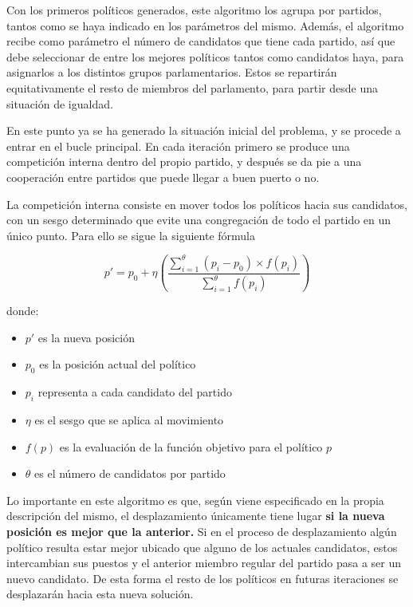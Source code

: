 Con los primeros políticos generados, este algoritmo los agrupa por partidos, tantos como se haya indicado en los parámetros del mismo. Además, el algoritmo recibe como parámetro el número de candidatos que tiene cada partido, así que debe seleccionar de entre los mejores políticos tantos como candidatos haya, para asignarlos a los distintos grupos parlamentarios. Estos se repartirán equitativamente el resto de miembros del parlamento, para partir desde una situación de igualdad.

En este punto ya se ha generado la situación inicial del problema, y se procede a entrar en el bucle principal. En cada iteración primero se produce una competición interna dentro del propio partido, y después se da pie a una cooperación entre partidos que puede llegar a buen puerto o no.

La competición interna consiste en mover todos los políticos hacia sus candidatos, con un sesgo determinado que evite una congregación de todo el partido en un único punto. Para ello se sigue la siguiente fórmula

\begin{equation}\label{poa-eq-desplazamiento}
	p' = p_0 + \eta(\frac{\sum_{i=1}^{\theta}(p_i - p_0) \times f(p_i)}{\sum_{i=1}^{\theta}f(p_i)})
\end{equation}

donde:

\begin{itemize}
	\item $p'$ es la nueva posición
	\item $p_0$ es la posición actual del político
	\item $p_i$ representa a cada candidato del partido
	\item $\eta$ es el sesgo que se aplica al movimiento
	\item $f(p)$ es la evaluación de la función objetivo para el político $p$
	\item $\theta$ es el número de candidatos por partido
\end{itemize}

Lo importante en este algoritmo es que, según viene especificado en la propia descripción del mismo, el desplazamiento únicamente tiene lugar \textbf{si la nueva posición es mejor que la anterior.} Si en el proceso de desplazamiento algún político resulta estar mejor ubicado que alguno de los actuales candidatos, estos intercambian sus puestos y el anterior miembro regular del partido pasa a ser un nuevo candidato. De esta forma el resto de los políticos en futuras iteraciones se desplazarán hacia esta nueva solución.

